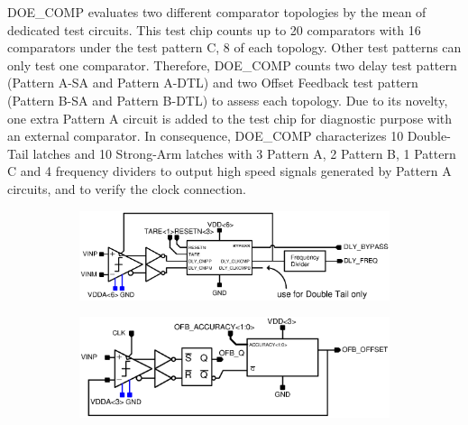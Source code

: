 DOE\_COMP evaluates two different comparator topologies by the mean of dedicated test circuits. This test chip counts up to 20 comparators with 16 comparators under the test pattern C, 8 of each topology. Other test patterns can only test one comparator. Therefore, DOE\_COMP counts two delay test pattern (Pattern A-SA and Pattern A-DTL) and two Offset Feedback test pattern (Pattern B-SA and Pattern B-DTL) to assess each topology. Due to its novelty, one extra Pattern A circuit is added to the test chip for diagnostic purpose with an external comparator. In consequence, DOE\_COMP characterizes 10 Double-Tail latches and 10 Strong-Arm latches with 3 Pattern A, 2 Pattern B, 1 Pattern C and 4 frequency dividers to output high speed signals generated by Pattern A circuits, and to verify the clock connection. 

\begin{figure}[htp]
    \centering
    \begin{subfigure}[b]{0.5\textwidth}
        \includegraphics[width=\textwidth]{Chapter5/Figs/comp_test/test_delay_bloc_close_sa.ps}
    \end{subfigure}
    \begin{subfigure}[b]{0.5\textwidth}
        \includegraphics[width=\textwidth]{Chapter5/Figs/comp_test/test_offset_bloc_close_sa.ps}
    \end{subfigure}
    \begin{subfigure}[b]{0.75\textwidth}

\end{subfigure}
\end{figure}
